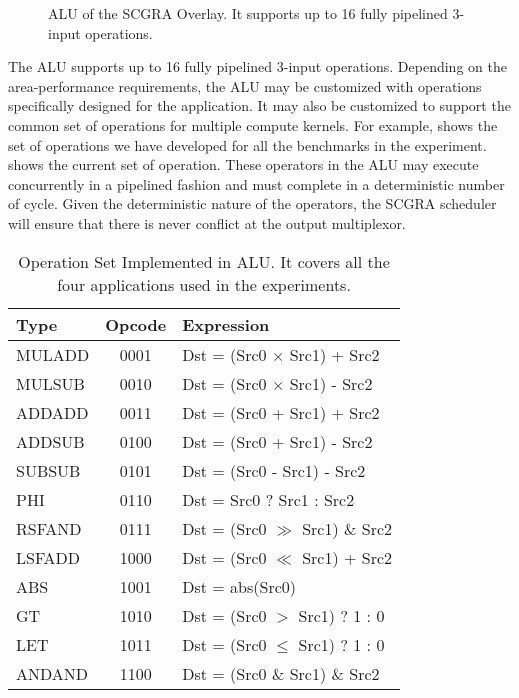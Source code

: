 \begin{figure}
\caption{ALU of the SCGRA Overlay. It supports up to 16 fully pipelined 3-input operations.}
\label{fig:ALU}
\end{figure} 

The ALU supports up to 16 fully pipelined 3-input operations.  Depending on the area-performance requirements, the ALU may be customized with operations specifically designed for the application.  It may also be customized to support the common set of operations for multiple compute kernels. For example,  shows the set of operations we have developed for all the benchmarks in the experiment.  shows the current set of operation. These operators in the ALU may execute concurrently in a pipelined fashion and must complete in a deterministic number of cycle.  Given the deterministic nature of the operators, the SCGRA scheduler will ensure that there is never conflict at the output multiplexor.

\begin{table}
\footnotesize
\centering
\caption{Operation Set Implemented in ALU. It covers all the four applications used in the experiments.
\label{tab:operations}}{
\footnotesize 
\centering
\begin{tabular}{l|c|l}
\hline
Type & Opcode & Expression \\

\hline
MULADD & 0001 & {Dst = (Src0 $\times$ Src1) + Src2} \\

\hline
MULSUB & 0010 & {Dst = (Src0 $\times$ Src1) - Src2} \\

\hline
ADDADD & 0011 & {Dst = (Src0 + Src1) + Src2} \\

\hline
ADDSUB & 0100 & {Dst = (Src0 + Src1) - Src2} \\

\hline
SUBSUB & 0101 & {Dst = (Src0 - Src1) - Src2} \\

\hline 
PHI & 0110 & {Dst = Src0 ? Src1 : Src2} \\

\hline
RSFAND & 0111 & {Dst = (Src0 $\gg$ Src1) \& Src2} \\

\hline
LSFADD & 1000 & {Dst = (Src0 $\ll$ Src1) + Src2} \\

\hline
ABS & 1001 & {Dst = abs(Src0)} \\

\hline
GT & 1010 & {Dst = (Src0 $>$ Src1) ? 1 : 0} \\

\hline
LET & 1011 & {Dst = (Src0 $\leq$ Src1) ? 1 : 0} \\

\hline
ANDAND & 1100 & {Dst = (Src0 \& Src1) \& Src2} \\

\hline
\end{tabular}
}
\end{table}


